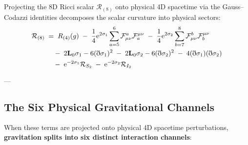 \documentclass[
    12pt,
    a4paper,
    headings=normal,
    twoside=false,
    open=any,
    parskip=half
]{scrbook}
\newcommand{\ethop}{\eth}
\newcommand{\eu}{\mathrm{e}}
\begin{document}
Projecting the 8D Ricci scalar $\mathcal{R}_{(8)}$ onto physical 4D spacetime via the Gauss--Codazzi identities decomposes the scalar curvature into physical sectors:
\begin{align}
\mathcal{R}_{(8)} &\;=\; R_{(4)}(g) \;-\; \frac{1}{4}\eu^{2\sigma_1}\sum_{a=5}^6 \mathcal{F}_{\mu\nu}^a \mathcal{F}_a^{\mu\nu} \;-\; \frac{1}{4}\eu^{2\sigma_2}\sum_{b=7}^8 \mathcal{F}_{\mu\nu}^b \mathcal{F}_b^{\mu\nu} \notag \\
&\quad \;-\; 2 \mathbf{L}_0\sigma_1 - 6 (\ethop\sigma_1)^2 \;-\; 2 \mathbf{L}_0\sigma_2 - 6 (\ethop\sigma_2)^2 \;-\; 4 (\ethop\sigma_1)(\ethop\sigma_2) \notag \\
&\quad \;-\; \eu^{-2\sigma_1}\mathcal{R}_{S_2} \;-\; \eu^{-2\sigma_2}\mathcal{R}_{I_2}
\label{eq:ch10_8d_curvature_decomposition}
\end{align}

---

\subsection{The Six Physical Gravitational Channels}

When these terms are projected onto physical 4D spacetime perturbations, \textbf{gravitation splits into six distinct interaction channels}:
\end{document}

